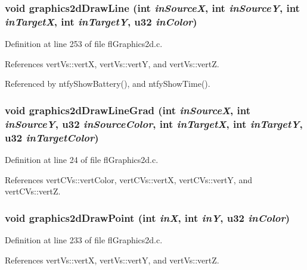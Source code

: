 \subsubsection{\setlength{\rightskip}{0pt plus 5cm}void graphics2d\-Draw\-Line (int {\em in\-Source\-X}, int {\em in\-Source\-Y}, int {\em in\-Target\-X}, int {\em in\-Target\-Y}, u32 {\em in\-Color})}\label{flGraphics2d_8h_91470709f2985e747c865ec42a1c5db6}




Definition at line 253 of file fl\-Graphics2d.c.

References vert\-Vs::vert\-X, vert\-Vs::vert\-Y, and vert\-Vs::vert\-Z.

Referenced by ntfy\-Show\-Battery(), and ntfy\-Show\-Time().
\subsubsection{\setlength{\rightskip}{0pt plus 5cm}void graphics2d\-Draw\-Line\-Grad (int {\em in\-Source\-X}, int {\em in\-Source\-Y}, u32 {\em in\-Source\-Color}, int {\em in\-Target\-X}, int {\em in\-Target\-Y}, u32 {\em in\-Target\-Color})}\label{flGraphics2d_8h_050ddc43fb117ac6974124bfc739f9ab}




Definition at line 24 of file fl\-Graphics2d.c.

References vert\-CVs::vert\-Color, vert\-CVs::vert\-X, vert\-CVs::vert\-Y, and vert\-CVs::vert\-Z.
\subsubsection{\setlength{\rightskip}{0pt plus 5cm}void graphics2d\-Draw\-Point (int {\em in\-X}, int {\em in\-Y}, u32 {\em in\-Color})}\label{flGraphics2d_8h_21062187e2fc088d5baff827b840956e}




Definition at line 233 of file fl\-Graphics2d.c.

References vert\-Vs::vert\-X, vert\-Vs::vert\-Y, and vert\-Vs::vert\-Z.
